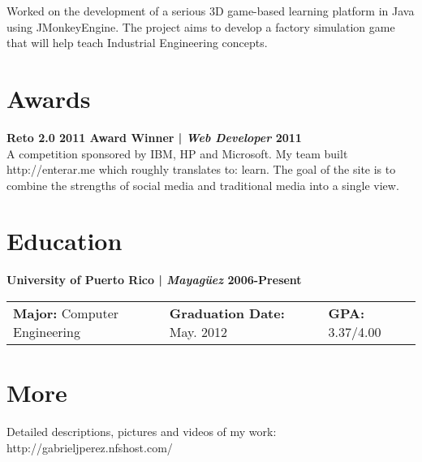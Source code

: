 \documentclass[margin,line]{res}
\begin{document}
\begin{resume}
Worked on the development of a serious 3D game-based learning platform in Java using JMonkeyEngine. The project aims to develop a factory simulation game that will help teach Industrial Engineering concepts.

\section{\sc Awards}

{\bf Reto 2.0 2011 Award Winner | {\em Web Developer} \hfill {\bf 2011 \\} }
\vspace{-.01cm}
A competition sponsored by IBM, HP and Microsoft. My team built http://enterar.me which roughly translates to: learn. The goal of the site is to combine the strengths of social media and traditional media into a single view. 





\section{\sc Education}

{\bf University of Puerto Rico | {\em Mayag\"uez } \hfill {\bf 2006-Present } }
\vspace{-.01cm}
\begin{tabular}{@{}p{2in}p{2in}p{2in}}
 {\bf Major:} Computer Engineering           & {\bf Graduation Date:} May. 2012  & {\bf GPA:} 3.37/4.00  \\            
\end{tabular}


\section{\sc More}
Detailed descriptions, pictures and videos of my work: http://gabrieljperez.nfshost.com/    \\

\end{resume}
\end{document}
